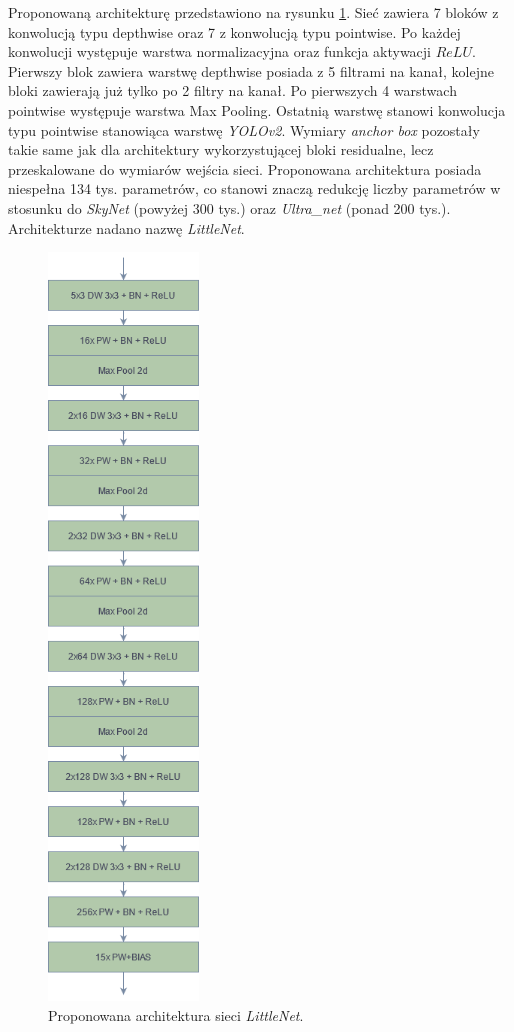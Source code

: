 Proponowaną architekturę przedstawiono na rysunku \ref{fig:LN_arch}. 
Sieć zawiera 7 bloków z konwolucją typu depthwise oraz 7 z konwolucją typu pointwise. Po każdej konwolucji występuje warstwa normalizacyjna oraz funkcja aktywacji $ReLU$. Pierwszy blok zawiera warstwę depthwise posiada z 5 filtrami na kanał, kolejne bloki zawierają już tylko po 2 filtry na kanał.
Po pierwszych 4 warstwach pointwise  występuje warstwa Max Pooling. 
Ostatnią warstwę stanowi konwolucja typu pointwise stanowiąca warstwę \emph{YOLOv2}. Wymiary \emph{anchor box} pozostały takie same jak dla architektury wykorzystującej bloki residualne, lecz przeskalowane do wymiarów wejścia sieci. 
Proponowana architektura posiada niespełna 134 tys. parametrów, co stanowi znaczą redukcję liczby parametrów w stosunku do \emph{SkyNet} (powyżej 300 tys.) oraz \emph{Ultra\_net} (ponad 200 tys.). 
Architekturze nadano %
nazwę \emph{LittleNet}.
\begin{figure}
    \centering
    \includegraphics[width=4cm]{images/LNv1}
    \caption{Proponowana architektura sieci \emph{LittleNet}.}
    \label{fig:LN_arch}
\end{figure}

